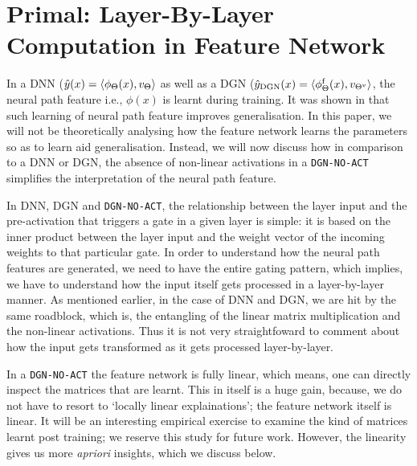 \section{Primal: Layer-By-Layer Computation in Feature Network}\label{sec:primal}
In a DNN ($\hat{y}(x)=\langle \phi_\Theta(x),v_{\Theta}\rangle$ as well as a DGN ($\hat{y}_{\text{DGN}}(x)=\langle \phi_\Theta^{\textrm{f}}(x),v_{{\Theta}^{\text{v}}}\rangle$, the neural path feature i.e., $\phi(x)$ is learnt during training. It was shown in \citep{npk} that such learning of neural path feature improves generalisation. In this paper, we will not be theoretically analysing how the feature network learns the parameters so as to learn aid generalisation. Instead, we will now discuss how in comparison to a DNN or DGN, the absence of non-linear activations in a \texttt{DGN-NO-ACT} simplifies the interpretation of the neural path feature. 

In DNN, DGN and \texttt{DGN-NO-ACT}, the relationship between the layer input and the pre-activation that triggers a gate in a given layer is simple: it is based on the inner product between the layer input and the weight vector of the incoming weights to that particular gate. In order to understand how the neural path features are generated, we need to have the entire gating pattern, which implies, we have to understand how the input itself gets processed in a layer-by-layer manner. As mentioned earlier, in the case of DNN and DGN, we are hit by the same roadblock, which is, the entangling of the linear matrix multiplication and the non-linear activations. Thus it is not very straightfoward to comment about how the input gets transformed as it gets processed layer-by-layer. 


In a \texttt{DGN-NO-ACT} the feature network is fully linear, which means, one can directly inspect the matrices that are learnt. This in itself is a huge gain, because, we do not have to resort to  `locally linear explainations'; the feature network itself is linear. It will be an interesting empirical exercise to examine the kind of matrices learnt post training; we reserve this study for future work. However, the linearity gives us more \emph{apriori} insights, which we discuss below. 

